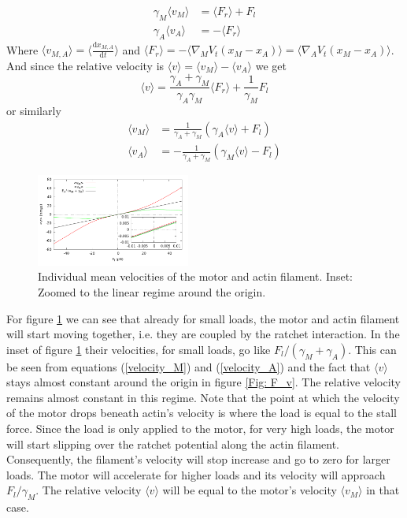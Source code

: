 \documentclass[aps,pre,twocolumn,showpacs,showkeys,a4paper]{revtex4}
\newcommand{\rmd}{{\mathrm d}}
\begin{document}
\begin{align*}
\gamma_M \langle v_M \rangle &= \langle F_r \rangle + F_l \\
\gamma_A \langle v_A \rangle &= -\langle F_r \rangle
\end{align*}
Where $\langle v_{M,A} \rangle = \langle \frac{\rmd x_{M,A}}{\rmd t} \rangle$ 
and $\langle F_r \rangle = - \langle \nabla_M V_t(x_M - x_A ) \rangle = \langle \nabla_A V_t(x_M - x_A ) \rangle $. 
And since the relative velocity is $\langle v \rangle = \langle v_{M} \rangle - \langle v_{A} \rangle$ we get
\begin{equation*}
\langle v \rangle = \frac{\gamma_A + \gamma_M}{\gamma_A \gamma_M} \langle F_r \rangle + \frac{1}{\gamma_M} F_l
\end{equation*}
or similarly
\begin{align}
\langle v_M \rangle &= \frac{1}{ \gamma_A + \gamma_M } \left( \gamma_A \langle v \rangle + F_l \right) \label{velocity_M} \\
\langle v_A \rangle &= -\frac{1}{ \gamma_A + \gamma_M } \left( \gamma_M \langle v \rangle - F_l \right)
\label{velocity_A}
\end{align}

\begin{figure}[t]
\centering
\includegraphics[width=0.45\textwidth,height=!]{individual_velocities}
\caption{Individual mean velocities of the motor and actin filament. Inset: Zoomed to the linear regime around the origin.}
\label{Fig: ind_v} 
\end{figure}
For figure \ref{Fig: ind_v} we can see that already for small loads, the motor and actin filament will start moving together, i.e. they are coupled by the ratchet interaction. 
In the inset of figure \ref{Fig: ind_v} their velocities, for small loads, go like $F_l/(\gamma_M + \gamma_A)$. 
This can be seen from equations (\ref{velocity_M}) and (\ref{velocity_A}) and the fact that $\langle v \rangle$ stays almost constant around the origin in figure \ref{Fig: F_v}. 
The relative velocity remains almost constant in this regime.
Note that the point at which the velocity of the motor drops beneath actin's velocity is where the load is equal to the stall force.
Since the load is only applied to the motor, for very high loads, the motor will start slipping over the ratchet potential along the actin filament. 
Consequently, the filament's velocity will stop increase and go to zero for larger loads. 
The motor will accelerate for higher loads and its velocity will approach $F_l/\gamma_M$. 
The relative velocity $\langle v \rangle$ will be equal to the motor's velocity $\langle v_M \rangle$ in that case.
\end{document}
